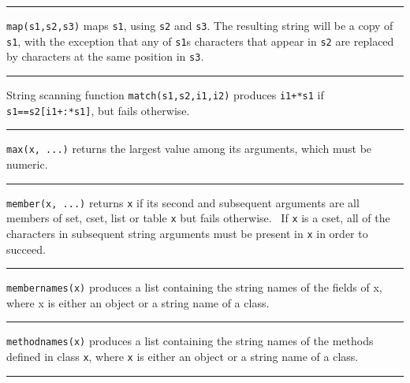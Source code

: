 \bigskip\hrule\vspace{0.1cm}

\noindent
{}\texttt{map(s1,s2,s3)} maps \texttt{s1}, using
\texttt{s2} and \texttt{s3}. The resulting string will be a copy of
\texttt{s1}, with the exception that any of
\texttt{s1}{\textquotesingle}s characters that appear in \texttt{s2}
are replaced by characters at the same position in \texttt{s3}.

\bigskip\hrule\vspace{0.1cm}

\noindent
{}String scanning function \texttt{match(s1,s2,i1,i2)}
produces \texttt{i1+*s1} if \texttt{s1==s2[i1+:*s1]}, but fails
otherwise.

\bigskip\hrule\vspace{0.1cm}

\noindent
{}\texttt{max(x, ...)} returns the largest value among its
arguments, which must be numeric.

\bigskip\hrule\vspace{0.1cm}

\noindent
{}\texttt{member(x, ...)} returns \texttt{x} if its second
and subsequent arguments are all members of set, cset, list or table
\texttt{x} but fails otherwise. \ If \texttt{x} is a cset, all of the
characters in subsequent string arguments must be present in \texttt{x}
in order to succeed.

\bigskip\hrule\vspace{0.1cm}

\noindent
\texttt{membernames(x)} produces a list containing the string names of
the fields of x, where x is either an object or a string name of a
class.

\bigskip\hrule\vspace{0.1cm}

\noindent
\texttt{methodnames(x)} produces a list containing the string names of
the methods defined in class \texttt{x}, where \texttt{x} is either an
object or a string name of a class.

\bigskip\hrule\vspace{0.1cm}

